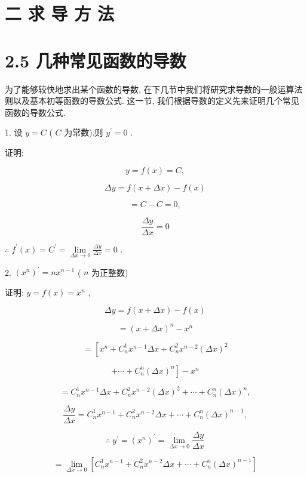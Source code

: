 \documentclass[10pt]{article}
\begin{document}
\section*{二 求 导 方 法}

\section*{2.5 几种常见函数的导数}

为了能够较快地求出某个函数的导数, 在下几节中我们将研究求导数的一般运算法则以及基本初等函数的导数公式. 这一节, 我们根据导数的定义先来证明几个常见函数的导数公式.

1. 设 \(y = C\) ( \(C\) 为常数),则 \({y}^{\prime } = 0\) .

证明:

\[
y = f\left( x\right) = C,
\]

\[
{\Delta y} = f\left( {x + {\Delta x}}\right) - f\left( x\right)
\]

\[
= C - C = 0,
\]

\[
\frac{\Delta y}{\Delta x} = 0
\]

\(\therefore \;{f}^{\prime }\left( x\right) = {C}^{\prime } = \mathop{\lim }\limits_{{{\Delta x} \rightarrow 0}}\frac{\Delta y}{\Delta x} = 0\) .

2. \({\left( {x}^{n}\right) }^{\prime } = n{x}^{n - 1}\) ( \(n\) 为正整数)

证明: \(y = f\left( x\right) = {x}^{n}\) ,

\[
{\Delta y} = f\left( {x + {\Delta x}}\right) - f\left( x\right)
\]

\[
= {\left( x + \Delta x\right) }^{n} - {x}^{n}
\]

\[
= \left\lbrack {{x}^{n} + {C}_{n}^{1}{x}^{n - 1}{\Delta x} + {C}_{n}^{2}{x}^{n - 2}{\left( \Delta x\right) }^{2}}\right.
\]

\[
\left. {+\cdots + {C}_{n}^{n}{\left( \Delta x\right) }^{n}}\right\rbrack - {x}^{n}
\]

\[
= {C}_{n}^{1}{x}^{n - 1}{\Delta x} + {C}_{n}^{2}{x}^{n - 2}{\left( \Delta x\right) }^{2} + \cdots + {C}_{n}^{n}{\left( \Delta x\right) }^{n},
\]

\[
\frac{\Delta y}{\Delta x} = {C}_{n}^{1}{x}^{n - 1} + {C}_{n}^{2}{x}^{n - 2}{\Delta x} + \cdots + {C}_{n}^{n}{\left( \Delta x\right) }^{n - 1},
\]

\[
\therefore \;{y}^{\prime } = {\left( {x}^{n}\right) }^{\prime } = \mathop{\lim }\limits_{{{\Delta x} \rightarrow 0}}\frac{\Delta y}{\Delta x}
\]

\[
= \mathop{\lim }\limits_{{{\Delta x} \rightarrow 0}}\left\lbrack {{C}_{n}^{1}{x}^{n - 1} + {C}_{n}^{2}{x}^{n - 2}{\Delta x} + \cdots + {C}_{n}^{n}{\left( \Delta x\right) }^{n - 1}}\right\rbrack
\]
\end{document}
